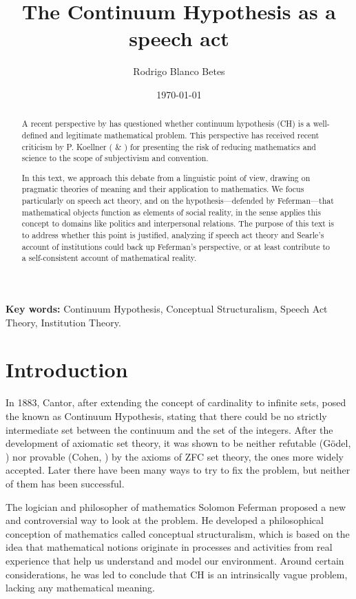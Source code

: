 \documentclass[11pt,a4paper]{article}
\title{\textbf{The Continuum Hypothesis as a speech act}}
\author{Rodrigo Blanco Betes}
\date{\today}
\begin{document}
\maketitle

\begin{abstract}
A recent perspective by \textcite{Feferman2011a} has questioned whether continuum hypothesis (CH) is a well-defined and legitimate mathematical problem. This perspective has received recent criticism by P. Koellner (\citeyear{Koellner2016} \& \citeyear{Koellner2022}) for presenting the risk of reducing mathematics and science to the scope of subjectivism and convention. 

In this text, we approach this debate from a linguistic point of view, drawing on pragmatic theories of meaning and their application to mathematics. We focus particularly on speech act theory, and on the hypothesis—defended by Feferman—that mathematical objects function as elements of social reality, in the sense \textcite{searle1995} applies this concept to domains like politics and interpersonal relations. The purpose of this text is to address whether this point is justified, analyzing if speech act theory and Searle's account of institutions could back up Feferman's perspective, or at least contribute to a self-consistent account of mathematical reality. 
\end{abstract}

\noindent\textbf{Key words:} Continuum Hypothesis, Conceptual Structuralism, Speech Act Theory, Institution Theory.

\section{Introduction}

In 1883, Cantor, after extending the concept of cardinality to infinite sets, posed the known as Continuum Hypothesis, stating that there could be no strictly intermediate set between the continuum and the set of the integers. After the development of axiomatic set theory, it was shown to be neither refutable (Gödel, \citeyear{Godel1940}) nor provable (Cohen, \citeyear{Cohen1966}) by the axioms of ZFC set theory, the ones more widely accepted. Later there have been many ways to try to fix the problem, but neither of them has been successful.

The logician and philosopher of mathematics Solomon Feferman proposed a new and controversial way to look at the problem. He developed a philosophical conception of mathematics called conceptual structuralism, which is based on the idea that mathematical notions originate in processes and activities from real experience that help us understand and model our environment. Around certain considerations, he was led to conclude that CH is an intrinsically vague problem, lacking any mathematical meaning.
\end{document}
